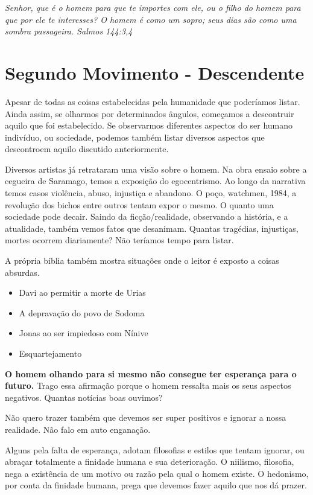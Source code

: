 \documentclass[12pt, legalpaper]{article}
\begin{document}
\emph{Senhor, que é o homem para que te importes com ele, ou o filho do homem para que por ele te interesses? O homem é como um sopro; seus dias são como uma sombra passageira. Salmos 144:3,4}

\newpage
\section{Segundo Movimento - Descendente}
Apesar de todas as coisas estabelecidas pela humanidade que poderíamos listar. Ainda assim, se olharmos por determinados ângulos, começamos a descontruir aquilo que foi estabelecido. Se observarmos diferentes aspectos do ser humano indivíduo, ou sociedade, podemos também listar diversos aspectos que descontroem aquilo discutido anteriormente.

Diversos artistas já retrataram uma visão sobre o homem. Na obra ensaio sobre a cegueira de Saramago, temos a exposição do egocentrismo. Ao longo da narrativa temos casos violência, abuso, injustiça e abandono. 
O poço, watchmen, 1984, a revolução dos bichos entre outros tentam expor o mesmo. O quanto uma sociedade pode decair.
Saindo da ficção/realidade, observando a história, e a atualidade, também vemos fatos que desanimam. Quantas tragédias, injustiças, mortes ocorrem diariamente? Não teríamos tempo para listar.

A própria bíblia também mostra situações onde o leitor é exposto a coisas absurdas. 

\begin{itemize}
   \item Davi ao permitir a morte de Urias
   \item A depravação do povo de Sodoma
   \item Jonas ao ser impiedoso com Nínive
   \item Esquartejamento
\end{itemize}

\textbf{O homem olhando para si mesmo não consegue ter esperança para o futuro.}
Trago essa afirmação porque o homem ressalta mais os seus aspectos negativos. Quantas notícias boas ouvimos?

Não quero trazer também que devemos ser super positivos e ignorar a nossa realidade. Não falo em auto enganação. 

Alguns pela falta de esperança, adotam filosofias e estilos que tentam ignorar, ou abraçar totalmente a finidade humana e sua deterioração. O niilismo, filosofia, nega a existência de um motivo ou razão pela qual o homem existe. O hedonismo, por conta da finidade humana, prega que devemos fazer aquilo que nos dá prazer. 
\end{document}
